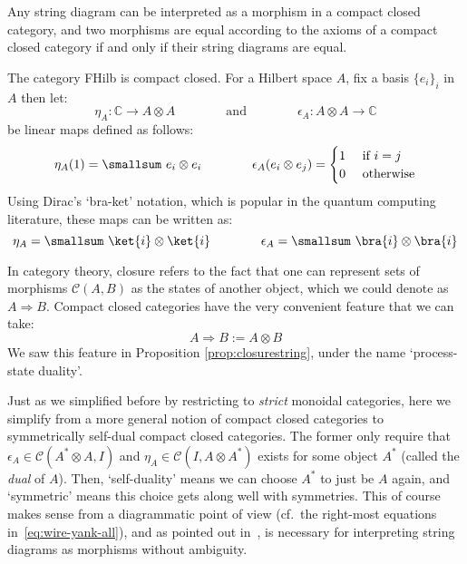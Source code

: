 \documentclass[12pt]{article}
\begin{document}
\begin{theorem}\label{thm:string-cmpcc}
  Any string diagram can be interpreted as a morphism in a compact closed category, and two morphisms are equal according to the axioms of a compact closed category if and only if their string diagrams are equal.
\end{theorem}

\begin{example}\label{ex:hilb-compact}
The category FHilb is compact closed. For a Hilbert space $A$, fix a basis $\{ e_i \}_i$ in $A$ then let:
\[ 
\eta_A : \mathbb C \to A \otimes A
   \qquad\qquad\textrm{and}\qquad\qquad 
   \epsilon_A : A \otimes A \to \mathbb C
\]
be linear maps defined as follows:
\[
   \eta_{A}(1) = \smallsum\ e_i \otimes e_i
   \qquad\qquad
   \epsilon_{A}(e_i \otimes e_j) = \begin{cases}
    1 & \textrm{ if } i = j \\
    0 & \textrm{ otherwise}
   \end{cases}   
   \]
Using Dirac's  `bra-ket' notation,  which is popular in the quantum computing literature, these maps can be written as:
\[ 
\eta_A = \smallsum\ \ket{i} \otimes \ket{i}
   \qquad\qquad
   \epsilon_A = \smallsum\ \bra{i} \otimes \bra{i} 
\]
\end{example}

In category theory, closure refers to the fact that one can represent sets of morphisms $\mathcal C(A,B)$ as the states of another object, which we could denote as $A\Rightarrow B$.  Compact closed categories have the very convenient feature that we can take: 
\[
A\Rightarrow B := A\otimes B
\]
We saw this feature in Proposition \ref{prop:closurestring},  under the name `process-state duality'.

Just as we simplified before by restricting to \textit{strict} monoidal categories, here we simplify from a more general notion of compact closed categories to symmetrically self-dual compact closed categories. The former only require that $\epsilon_A \in \mathcal C(A^* \otimes A, I)$ and $\eta_A \in \mathcal C(I, A \otimes A^*)$ exists for some object $A^*$ (called the \textit{dual} of $A$). Then, `self-duality' means we can choose $A^*$ to just be $A$ again, and `symmetric' means this choice gets along well with symmetries.  This of course makes sense from a diagrammatic point of view (cf.~the right-most equations in~\eqref{eq:wire-yank-all}),  and as pointed out in~\cite{SelingerSelfDual}, is necessary for interpreting string diagrams as morphisms without ambiguity. 
\end{document}
